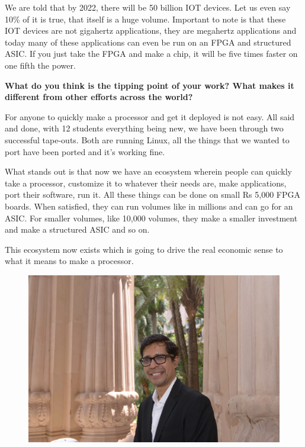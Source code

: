 \begin{multicols}{2}
We are told that by 2022, there will be 50 billion IOT devices. Let us even say 10\% of it is true, that itself is a huge volume. Important to note is that these IOT devices are not gigahertz applications, they are megahertz applications and today many of these applications can even be run on an FPGA and structured ASIC. If you just take the FPGA and make a chip, it will be five times faster on one fifth the power.

{\bf What do you think is the tipping point of your work? What makes it different from other efforts across the world?}

For anyone to quickly make a processor and get it deployed is not easy. All said and done, with 12 students everything being new, we have been through two successful tape-outs. Both are running Linux, all the things that we wanted to port have been ported and it's working fine.

What stands out is that now we have an ecosystem wherein people can quickly take a processor, customize it to whatever their needs are, make applications, port their software, run it. All these things can be done on small Rs 5,000 FPGA boards. When satisfied, they can run volumes like in millions and can go for an ASIC. For smaller volumes, like 10,000 volumes, they make a smaller investment and make a structured ASIC and so on. 

This ecosystem now exists which is going to drive the real economic sense to what it means to make a processor.

\begin{figure}[H]
\centering
\includegraphics[scale=1.1]{src/Figures/authors/Kamakoti1.jpg}
\end{figure}


\end{multicols}
